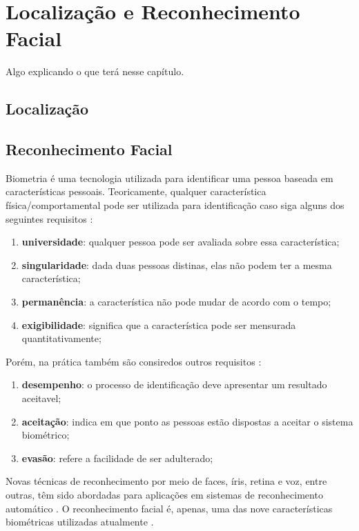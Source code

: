 
\chapter{Localização e Reconhecimento Facial}

	Algo explicando o que terá nesse capítulo.


\section{Localização}

\section{Reconhecimento Facial}

Biometria é uma tecnologia utilizada para identificar uma pessoa baseada em características pessoais. Teoricamente, qualquer característica física/comportamental pode ser utilizada para identificação caso siga alguns dos seguintes requisitos \cite{milene}: 

	\begin{enumerate}
		\item \textbf{universidade}: qualquer pessoa pode ser avaliada sobre essa característica;
		\item \textbf{singularidade}: dada duas pessoas distinas, elas não podem ter a mesma característica;
		\item \textbf{permanência}: a característica não pode mudar de acordo com o tempo;
		\item \textbf{exigibilidade}: significa que a característica pode ser mensurada quantitativamente;
	\end{enumerate}

Porém, na prática também são consiredos outros requisitos \cite{milene}:

	\begin{enumerate}
		\item \textbf{desempenho}: o processo de identificação deve apresentar um resultado aceitavel;
		\item \textbf{aceitação}: indica em que ponto as pessoas estão dispostas a aceitar o sistema biométrico;
		\item \textbf{evasão}: refere a facilidade de ser adulterado;
	\end{enumerate}

Novas técnicas de reconhecimento por meio de faces, íris, retina e voz, entre outras, têm sido abordadas para aplicações em sistemas de reconhecimento automático \cite{bolle} \cite{saocarlos}. O reconhecimento facial é, apenas, uma das nove características biométricas utilizadas atualmente \cite{milene}.
	
